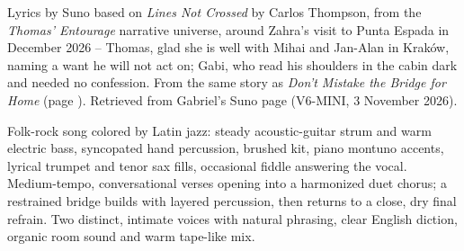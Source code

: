 
\label{sec:keep-your-hands-kind}
\begin{notes}
Lyrics by Suno based on \emph{Lines Not Crossed} by Carlos Thompson, from the \emph{Thomas' Entourage} narrative universe, around Zahra's visit to Punta Espada in December 2026 -- Thomas, glad she is well with Mihai and Jan-Alan in Kraków, naming a want he will not act on; Gabi, who read his shoulders in the cabin dark and needed no confession. From the same story as \emph{Don't Mistake the Bridge for Home} (page \pageref{sec:dont-mistake-the-bridge-for-home}). Retrieved from Gabriel's Suno page (V6-MINI, 3 November 2026).
\end{notes}
\begin{style}
Folk-rock song colored by Latin jazz: steady acoustic-guitar strum and warm electric bass, syncopated hand percussion, brushed kit, piano montuno accents, lyrical trumpet and tenor sax fills, occasional fiddle answering the vocal. Medium-tempo, conversational verses opening into a harmonized duet chorus; a restrained bridge builds with layered percussion, then returns to a close, dry final refrain. Two distinct, intimate voices with natural phrasing, clear English diction, organic room sound and warm tape-like mix.
\end{style}
